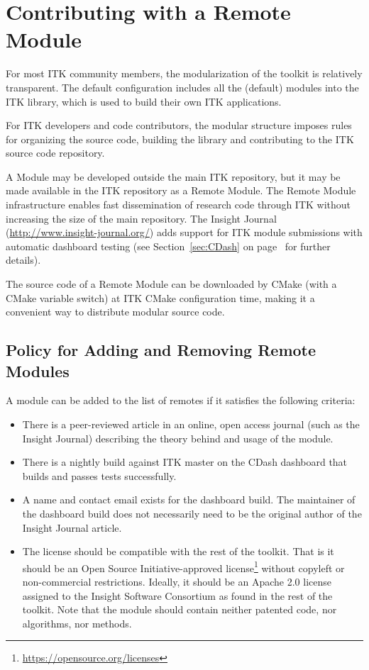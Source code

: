 \section{Contributing with a Remote Module}
\label{sec:ContributingRemoteModules}

For most ITK community members, the modularization of the toolkit is relatively
transparent. The default configuration includes all the (default) modules into
the ITK library, which is used to build their own ITK applications.

For ITK developers and code contributors, the modular structure imposes rules
for organizing the source code, building the library and contributing to the
ITK source code repository.

A Module may be developed outside the main ITK repository, but it may be
made available in the ITK repository as a Remote Module. The Remote Module
infrastructure enables fast dissemination of research code through ITK without
increasing the size of the main repository. The Insight Journal
(\url{http://www.insight-journal.org/}) adds support for ITK module submissions
with automatic dashboard testing (see Section~\ref{sec:CDash} on
page~\pageref{sec:CDash} for further details).

The source code of a Remote Module can be downloaded by CMake (with a CMake
variable switch) at ITK CMake configuration time, making it a convenient way to
distribute modular source code.

\subsection{Policy for Adding and Removing Remote Modules}
\label{subsec:RemoteModuleAddRemovePolicy}

A module can be added to the list of remotes if it satisfies the following
criteria:
\begin{itemize}
\item There is a peer-reviewed article in an online, open access journal (such
as the Insight Journal) describing the theory behind and usage of the module.
\item There is a nightly build against ITK master on the CDash dashboard that
builds and passes tests successfully.
\item A name and contact email exists for the dashboard build. The maintainer
of the dashboard build does not necessarily need to be the original author of
the Insight Journal article.
\item The license should be compatible with the rest of the toolkit. That is
it should be an Open Source Initiative-approved
license\footnote{\url{https://opensource.org/licenses}} without copyleft or
non-commercial restrictions. Ideally, it should be an Apache 2.0 license
assigned to the Insight Software Consortium as found in the rest of the
toolkit. Note that the module should contain neither patented code, nor
algorithms, nor methods.
\end{itemize}


